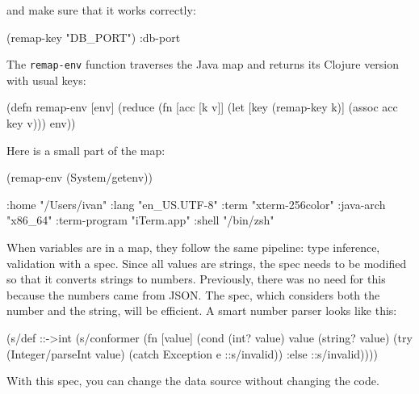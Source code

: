 \noindent
and make sure that it works correctly:

\begin{english}
  \begin{clojure}
(remap-key "DB_PORT")
:db-port
  \end{clojure}
\end{english}


The \verb|remap-env| function traverses the Java map and returns its Clojure version with usual keys:

\begin{english}
  \begin{clojure}
(defn remap-env [env]
  (reduce
   (fn [acc [k v]]
     (let [key (remap-key k)]
       (assoc acc key v)))
   {}
   env))
  \end{clojure}
\end{english}

Here is a small part of the map:

\begin{english}
  \begin{clojure}
(remap-env (System/getenv))

{:home "/Users/ivan"
 :lang "en_US.UTF-8"
 :term "xterm-256color"
 :java-arch "x86_64"
 :term-program "iTerm.app"
 :shell "/bin/zsh"}
  \end{clojure}
\end{english}

When variables are in a map, they follow the same pipeline: type inference, validation with a spec. Since all values are strings, the spec needs to be modified so that it converts strings to numbers. Previously, there was no need for this because the numbers came from JSON. The spec, which considers both the number and the string, will be efficient. A smart number parser looks like this:

\begin{english}
  \begin{clojure}
(s/def ::->int
  (s/conformer
   (fn [value]
     (cond
       (int? value) value
       (string? value)
       (try (Integer/parseInt value)
            (catch Exception e
              ::s/invalid))
       :else ::s/invalid))))
  \end{clojure}
\end{english}

\noindent
With this spec, you can change the data source without changing the code.

